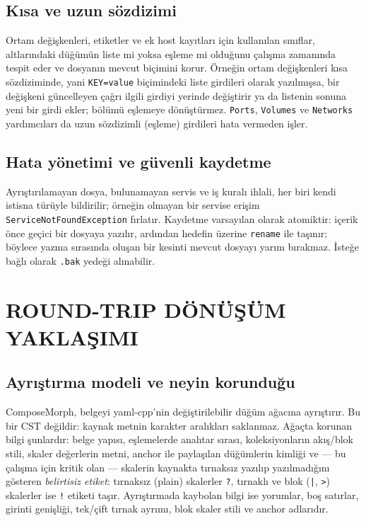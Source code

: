 \documentclass[12pt,a4paper]{article}
\begin{document}
\subsection{Kısa ve uzun sözdizimi}
Ortam değişkenleri, etiketler ve ek host kayıtları için kullanılan
sınıflar, altlarındaki düğümün liste mi yoksa eşleme mi olduğunu çalışma
zamanında tespit eder ve dosyanın mevcut biçimini korur. Örneğin ortam
değişkenleri kısa sözdiziminde, yani \texttt{KEY=value} biçimindeki liste
girdileri olarak yazılmışsa, bir değişkeni güncelleyen çağrı ilgili
girdiyi yerinde değiştirir ya da listenin sonuna yeni bir girdi ekler;
bölümü eşlemeye dönüştürmez. \texttt{Ports}, \texttt{Volumes} ve \texttt{Networks}
yardımcıları da uzun sözdizimli (eşleme) girdileri hata vermeden işler.

\subsection{Hata yönetimi ve güvenli kaydetme}
Ayrıştırılamayan dosya, bulunamayan servis ve iş kuralı ihlali, her biri
kendi istisna türüyle bildirilir; örneğin olmayan bir servise erişim
\texttt{ServiceNotFoundException} fırlatır.
Kaydetme varsayılan olarak atomiktir: içerik önce geçici bir dosyaya
yazılır, ardından hedefin üzerine \texttt{rename} ile taşınır; böylece
yazma sırasında oluşan bir kesinti mevcut dosyayı yarım bırakmaz.
İsteğe bağlı olarak \texttt{.bak} yedeği alınabilir.

\section{ROUND-TRIP DÖNÜŞÜM YAKLAŞIMI}
\label{sec:yaklasim}

\subsection{Ayrıştırma modeli ve neyin korunduğu}
ComposeMorph, belgeyi yaml-cpp'nin değiştirilebilir düğüm ağacına
ayrıştırır. Bu bir CST değildir: kaynak metnin karakter aralıkları
saklanmaz. Ağaçta korunan bilgi şunlardır: belge yapısı, eşlemelerde
anahtar sırası, koleksiyonların akış/blok stili, skaler değerlerin metni,
anchor ile paylaşılan düğümlerin kimliği ve --- bu çalışma için kritik
olan --- skalerin kaynakta tırnaksız yazılıp yazılmadığını gösteren
\emph{belirtisiz etiket}: tırnaksız (plain) skalerler \texttt{?},
tırnaklı ve blok (\texttt{|}, \texttt{>}) skalerler ise \texttt{!} etiketi
taşır. Ayrıştırmada kaybolan bilgi ise yorumlar, boş satırlar, girinti
genişliği, tek/çift tırnak ayrımı, blok skaler stili ve anchor adlarıdır.
\end{document}
